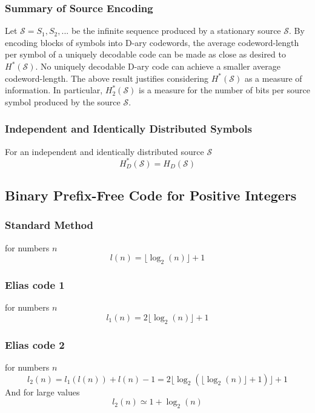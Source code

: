\documentclass{article}
\begin{document}
\subsubsection{Summary of Source Encoding} Let $ \mathcal{S} = S_1,S_2,... $ be the infinite sequence produced by a stationary source $ \mathcal{S} $. By encoding blocks of symbols into D-ary codewords, the average codeword-length per symbol of a uniquely decodable code can be made as close as desired to $ H^{*}(\mathcal{S}) $. No uniquely decodable D-ary code can achieve a smaller average codeword-length. The above result justifies considering $ H^{*}(\mathcal{S}) $ as a measure of information. In particular, $ H_2^{*}(\mathcal{S}) $ is a measure for the number of bits per source symbol produced by the source $ \mathcal{S} $.

\subsubsection{Independent and Identically Distributed Symbols} For an independent and identically distributed source $ \mathcal{S} $
\begin{equation}
H_D^{*}(\mathcal{S}) = H_D(\mathcal{S})
\end{equation}

\subsection{Binary Prefix-Free Code for Positive Integers}
\subsubsection{Standard Method} for numbers $ n $
\begin{equation}
l(n) = \lfloor \log_2(n) \rfloor + 1
\end{equation} 

\subsubsection{Elias code 1} for numbers $ n $
\begin{equation}
l_1(n) = 2\lfloor \log_2(n) \rfloor + 1
\end{equation}

\subsubsection{Elias code 2} for numbers $ n $
\begin{equation}
l_2(n) = l_1(l(n)) + l(n) - 1 = 2\lfloor \log_2(\lfloor \log_2(n) \rfloor + 1) \rfloor + 1
\end{equation}
And for large values
\begin{equation}
l_2(n) \simeq 1 + \log_2(n)
\end{equation}
\end{document}
